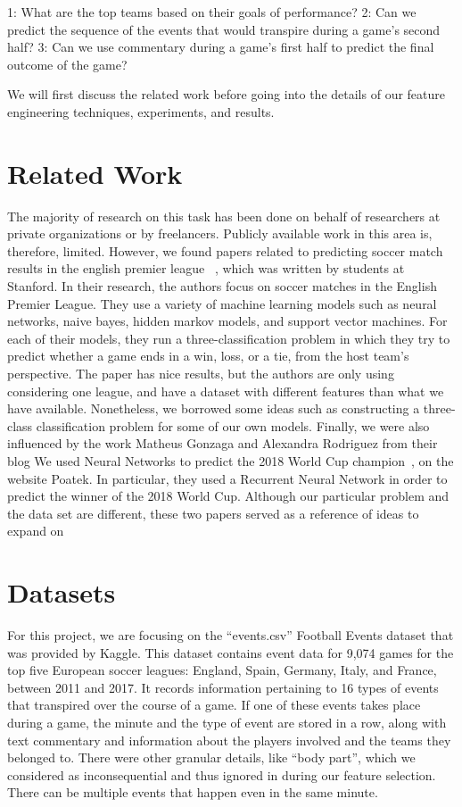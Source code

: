 \documentclass[11pt,a4paper]{article}
\begin{document}
1: What are the top teams based on their goals of performance?
2: Can we predict the sequence of the events that would transpire during a game’s second half?
3: Can we use commentary during a game’s first half to predict the final outcome of the game?

We will first discuss the related work before going into the details of our feature engineering techniques, experiments, and results.


\section{Related Work}

The majority of research on this task has been done on behalf of researchers at private organizations or by freelancers. Publicly available work in this area is, therefore, limited. However, we found papers related to predicting soccer match results in the english premier league~\cite{soccerpredict,timmaraju2013game,joseph2006predicting,rue2000prediction} , which was written by students at Stanford. In their research, the authors focus on soccer matches in the English Premier League. They use a variety of machine learning models such as neural networks, naive bayes, hidden markov models, and support vector machines. For each of their models, they run a three-classification problem in which they try to predict whether a game ends in a win, loss, or a tie, from the host team’s perspective. The paper has nice results, but the authors are only using considering one league, and have a dataset with different features than what we have available. Nonetheless, we borrowed some ideas such as constructing a three-class classification problem for some of our own models. Finally, we were also influenced by the work Matheus Gonzaga and Alexandra Rodriguez from their blog We used Neural Networks to predict the 2018 World Cup champion~\cite{worldcup}, on the website Poatek. In particular, they used a Recurrent Neural Network in order to predict the winner of the 2018 World Cup. Although our particular problem and the data set are different, these two papers served as a reference of ideas to expand on


\section{Datasets}

For this project, we are focusing on the “events.csv” Football Events dataset that was provided by Kaggle. This dataset contains event data for 9,074 games for the top five European soccer leagues: England, Spain, Germany, Italy, and France, between 2011 and 2017.  It records information pertaining to 16 types of events that transpired over the course of a game. If one of these events takes place during a game, the minute and the type of event are stored in a row, along with text commentary and information about the players involved and the teams they belonged to. There were other granular details, like “body part”, which we considered as inconsequential and thus ignored in during our feature selection. There can be multiple events that happen even in the same minute.
\end{document}
